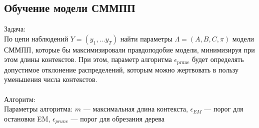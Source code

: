 \documentclass{matmex-diploma-custom}
\begin{document}
\subsection{Обучение модели СММПП}
{\large Задача:} 
\\
По цепи наблюдений $ Y = (y_{1}, ... y_{T}) $ найти параметры $\Lambda = (A,B,C,\pi)$ модели СММПП, которые бы максимизировали правдоподобие модели, минимизируя при этом длины контекстов. При этом, параметр алгоритма $ \epsilon_{\text{prune}} $ будет определять допустимое отклонение распределений, которым можно жертвовать в пользу уменьшения числа контекстов.
\\\\
{\large Алгоритм:}
\\
Параметры алгоритма: 
$ m $ --- максимальная длина контекста, 
$ \epsilon_{\textit{EM}} $ --- порог для остановки EM,
$ \epsilon_{\textit{prune}} $ --- порог для обрезания дерева
\\
\end{document}
